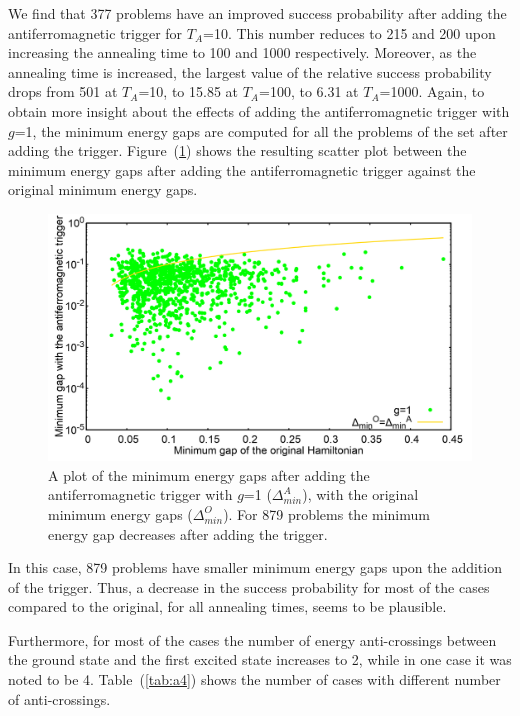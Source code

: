 \documentclass[../main.tex]{subfiles}
\begin{document}
We find that 377 problems have an improved success probability after adding the antiferromagnetic trigger for $T_A$=10. This number reduces to 215 and 200 upon increasing the annealing time to 100 and 1000 respectively. Moreover, as the annealing time is increased, the largest value of the relative success probability drops from 501 at $T_A$=10, to 15.85 at $T_A$=100, to 6.31 at $T_A$=1000. Again, to obtain more insight about the effects of adding the antiferromagnetic trigger with $g$=1, the minimum energy gaps are computed for all the problems of the set after adding the trigger. Figure~(\ref{fig:a21}) shows the resulting scatter plot between the minimum energy gaps after adding the antiferromagnetic trigger against the original minimum energy gaps.

\begin{figure}
\centering 
\includegraphics[scale=0.2]{MinGap_A_g1.png}
\caption{A plot of the minimum energy gaps after adding the antiferromagnetic trigger with $g$=1 ($\Delta_{min}^A$), with the original minimum energy gaps ($\Delta_{min}^O$). For 879 problems the minimum energy gap decreases after adding the trigger.}
\label{fig:a21}
\end{figure}
In this case, 879 problems have smaller minimum energy gaps upon the addition of the trigger. Thus, a decrease in the success probability for most of the cases compared to the original, for all annealing times, seems to be plausible.

Furthermore, for most of the cases the number of energy anti-crossings between the ground state and the first excited state increases to 2, while in one case it was noted to be 4. Table~(\ref{tab:a4}) shows the number of cases with different number of anti-crossings.
\end{document}

